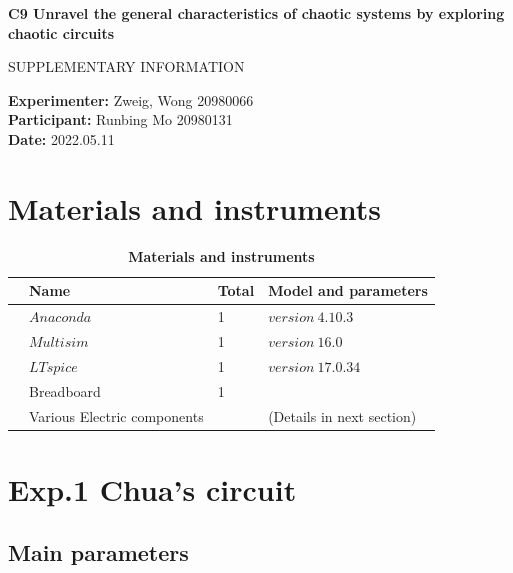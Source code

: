 \documentclass[12pt,a4paper,UTF8]{article}
\begin{document}

\begin{center}
\LARGE\textbf{C9 Unravel the general characteristics of chaotic systems by exploring chaotic circuits}

\vspace{0.5em}
\large{SUPPLEMENTARY INFORMATION}
\end{center}

\noindent
\textbf{Experimenter:} Zweig, Wong 20980066 \\
\textbf{Participant:} Runbing Mo 20980131 \\
\textbf{Date:} 2022.05.11


\tableofcontents
\newpage

\section{Materials and instruments}
\begin{table}[htbp]
    \centering
    \caption{\textbf{Materials and instruments}}
        \begin{tabular}{llll}
            \toprule
            &Name &Total &Model and parameters \\
            \midrule
            &$Anaconda$	&1	&$version\ 4.10.3$    \\    
            &$Multisim$	&1	&$version\ 16.0$    \\    
            &$LTspice$	&1	&$version\ 17.0.34$    \\    
            &Breadboard	&1	&    \\   
            &Various Electric components	&	&(Details in next section)    \\   
            \bottomrule
        \end{tabular}
\end{table}	


\section{Exp.1 Chua's circuit}
    \subsection{Main parameters}
\end{document}
